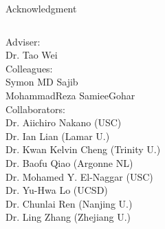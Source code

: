 \documentclass{beamer}
\begin{document}
\begin{frame}{Acknowledgment}
\vspace{-.5cm}
\begin{columns}
	Adviser: \\
	\hspace{.5 cm} Dr. Tao Wei \\
	Colleagues: \\
	\hspace{.5 cm} Symon MD Sajib \\
	\hspace{.5 cm} MohammadReza SamieeGohar\\
	Collaborators: \\ 
	\hspace{.5 cm} Dr. Aiichiro Nakano (USC)\\
	\hspace{.5 cm} Dr. Ian Lian (Lamar U.) \\
	\hspace{.5 cm} Dr. Kwan Kelvin Cheng (Trinity U.) \\
	\hspace{.5 cm} Dr. Baofu Qiao (Argonne NL)\\
	\hspace{.5 cm} Dr. Mohamed Y. El-Naggar (USC)\\
	\hspace{.5 cm} Dr. Yu-Hwa Lo (UCSD)\\
	\hspace{.5 cm} Dr. Chunlai Ren (Nanjing U.)\\
	\hspace{.5 cm} Dr. Ling Zhang (Zhejiang U.) \\
	

\end{columns}
\end{frame}
\end{document}
